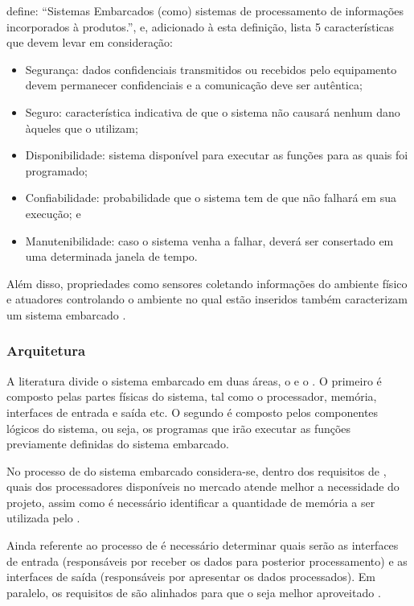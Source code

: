  define: ``Sistemas Embarcados (como) sistemas
de processamento de informações incorporados à produtos.'', e, adicionado à
esta definição, lista 5 características que devem levar em consideração: 

\begin{itemize}
  \item Segurança: dados confidenciais transmitidos ou recebidos pelo
  equipamento devem permanecer confidenciais e a comunicação deve ser autêntica;
  \item Seguro: característica indicativa de que o sistema não causará nenhum dano àqueles que o utilizam;
  \item Disponibilidade: sistema disponível para executar as funções para as quais
  foi programado; 
  \item Confiabilidade: probabilidade que o sistema tem de que não
  falhará em sua execução; e
  \item Manutenibilidade: caso o sistema venha a falhar, deverá 
  ser consertado em uma determinada janela de tempo.
\end{itemize}

Além disso, propriedades como sensores coletando informações do ambiente
físico e atuadores controlando o ambiente no qual estão inseridos também
caracterizam um sistema embarcado \cite{marwedel2010embedded}.

\subsubsection{Arquitetura}\label{subsubsec:arquitetura}

A literatura divide o sistema embarcado em duas áreas, o \hardware[] e o 
\software. O primeiro é composto pelas partes físicas do sistema, 
tal como o processador, memória, interfaces de entrada e saída etc. O segundo é
composto pelos componentes lógicos do sistema, ou seja, os programas que 
irão executar as funções previamente definidas do sistema embarcado.

No processo de \design[] do sistema embarcado considera-se, dentro dos
requisitos de \hardware, quais dos processadores disponíveis no mercado atende
melhor a necessidade do projeto, assim como é necessário identificar a
quantidade de memória a ser utilizada pelo \software[]. 

Ainda referente ao processo de \design[] é necessário determinar quais serão as
interfaces de entrada (responsáveis por receber os dados para posterior
processamento) e as interfaces de saída (responsáveis por apresentar os dados
processados). Em paralelo, os requisitos de \software[] são alinhados para que o
\hardware[] seja melhor aproveitado \cite{wolf2012computers}.

